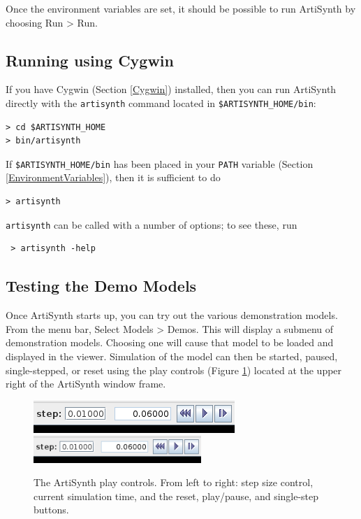 Once the environment variables are set, it should be possible to run
ArtiSynth by choosing {\sf Run > Run}.

\ifWindows
\subsection{Running using Cygwin}

If you have Cygwin (Section \ref{Cygwin}) installed, 
then you can run ArtiSynth directly with the {\tt artisynth} command
located in {\tt \$ARTISYNTH\_HOME/bin}:
\begin{verbatim}
> cd $ARTISYNTH_HOME
> bin/artisynth
\end{verbatim}
If {\tt \$ARTISYNTH\_HOME/bin} has been placed in your {\tt PATH}
variable (Section \ref{EnvironmentVariables}), then it
is sufficient to do
\begin{verbatim}
> artisynth
\end{verbatim}
{\tt artisynth} can be called with a number of options; to see these, run
\begin{verbatim}
 > artisynth -help
\end{verbatim}
\else\fi

\subsection{Testing the Demo Models}

Once ArtiSynth starts up, you can try out the various demonstration
models. From the menu bar, Select {\sf Models > Demos}.  This
will display a submenu of demonstration models. Choosing one will
cause that model to be loaded and displayed in the viewer.  Simulation
of the model can then be started, paused, single-stepped, or reset
using the play controls (Figure \ref{PlayControlsFig})
located at the upper right of the ArtiSynth window frame.

\begin{figure}
\begin{center}
\iflatexml
\includegraphics[]{images/playControls}
\else
\includegraphics[width=2.5in]{images/playControls}
\fi
\end{center}
\caption{The ArtiSynth play controls. From left to right: step size
control, current simulation time, and the reset, play/pause, and
single-step buttons.}%
\label{PlayControlsFig}
\end{figure}

